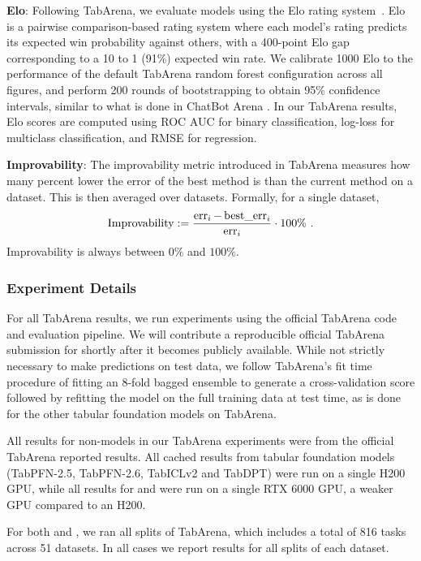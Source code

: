 \textbf{Elo}: Following TabArena, we evaluate models using the Elo rating system~\citep{elo1967proposed}. Elo is a pairwise
comparison-based rating system where each model’s rating predicts its expected win probability against others, with a 400-point Elo gap corresponding to a 10 to 1 (91\%) expected win rate. We calibrate 1000 Elo to the performance of the default TabArena random forest configuration across all figures, and perform 200 rounds of bootstrapping to obtain 95\% confidence intervals, similar to what is done in ChatBot Arena \cite{chiang2024chatbot}. In our TabArena results, Elo scores are computed using ROC AUC for binary classification, log-loss for multiclass classification, and RMSE for regression.

\textbf{Improvability}: The improvability metric introduced in TabArena measures how many percent lower the error of the best method is than the current method on a dataset. This is then averaged over datasets. Formally, for a single dataset,
    \begin{equation*}
        \operatorname{Improvability} := \frac{\operatorname{err}_i - \operatorname{best\_err}_i}{\operatorname{err}_i} \cdot 100\%~.
    \end{equation*}
    Improvability is always between $0\%$ and $100\%$.

\subsubsection{Experiment Details}

For all TabArena results, we run experiments using the official TabArena code and evaluation pipeline. We will contribute a reproducible official TabArena submission for \ourmodel shortly after it becomes publicly available. While not strictly necessary to make predictions on test data, we follow TabArena's fit time procedure of fitting an 8-fold bagged ensemble to generate a cross-validation score followed by refitting the model on the full training data at test time, as is done for the other tabular foundation models on TabArena.

All results for non-\ourmodel models in our TabArena experiments were from the official TabArena reported results. All cached results from tabular foundation models (TabPFN-2.5, TabPFN-2.6, TabICLv2 and TabDPT) were run on a single H200 GPU, while all results for \ourmodel and \ourmodelenhanced were run on a single RTX 6000 GPU, a weaker GPU compared to an H200.

For both \ourmodel and \ourmodelenhanced, we ran all splits of TabArena, which includes a total of 816 tasks across 51 datasets. In all cases we report results for all splits of each dataset.

